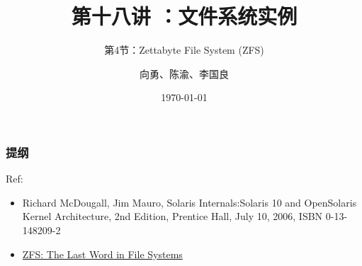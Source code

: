 


\title[第18讲]{第十八讲 ：文件系统实例} %
\subtitle{第4节：Zettabyte File System (ZFS)}
\author{向勇、陈渝、李国良} %
\date{\today} %



\begin{frame}
\titlepage %
\end{frame}

\begin{frame}
\frametitle{提纲} %
\tableofcontents %

Ref:
    \begin{itemize}
        \item Richard McDougall, Jim Mauro, Solaris Internals:Solaris 10 and OpenSolaris Kernel Architecture, 2nd Edition, Prentice Hall, July 10, 2006, ISBN 0-13-148209-2
        \item \href{http://pages.cs.wisc.edu/~remzi/OSTEP/Citations/zfs_last.pdf}{ZFS: The Last Word in File Systems}
    \end{itemize}

\end{frame}
% 
% 
% 
% 
